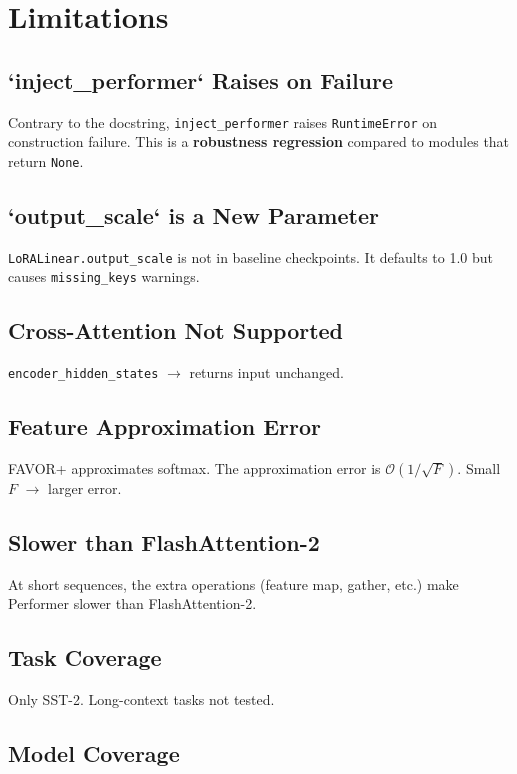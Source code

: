 
\section{Limitations}

\subsection{`inject\_performer` Raises on Failure}

Contrary to the docstring, \texttt{inject\_performer} raises \texttt{RuntimeError} on 
construction failure. This is a \textbf{robustness regression} compared to 
modules that return \texttt{None}.

\subsection{`output\_scale` is a New Parameter}

\texttt{LoRALinear.output\_scale} is not in baseline checkpoints. It defaults to 
1.0 but causes \texttt{missing\_keys} warnings.

\subsection{Cross-Attention Not Supported}

\texttt{encoder\_hidden\_states} $\to$ returns input unchanged.

\subsection{Feature Approximation Error}

FAVOR+ approximates softmax. The approximation error is $\mathcal{O}(1/\sqrt{F})$. 
Small $F$ $\to$ larger error.

\subsection{Slower than FlashAttention-2}

At short sequences, the extra operations (feature map, gather, etc.) make 
Performer slower than FlashAttention-2.

\subsection{Task Coverage}

Only SST-2. Long-context tasks not tested.

\subsection{Model Coverage}

